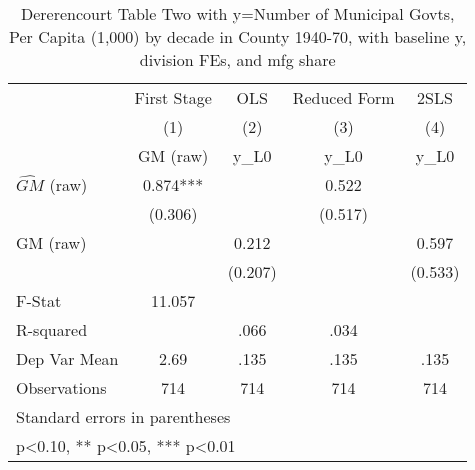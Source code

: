 \begin{table}[htbp]\centering
\def\sym#1{\ifmmode^{#1}\else\(^{#1}\)\fi}
\caption{Dererencourt Table Two with y=Number of Municipal Govts, Per Capita (1,000) by decade in County 1940-70, with baseline y, division FEs, and mfg share}
\begin{tabular}{l*{4}{c}}
\toprule
                    & First Stage   &         OLS   &Reduced Form   &        2SLS   \\
                    &\multicolumn{1}{c}{(1)}&\multicolumn{1}{c}{(2)}&\multicolumn{1}{c}{(3)}&\multicolumn{1}{c}{(4)}\\
                    &\multicolumn{1}{c}{GM  (raw)}&\multicolumn{1}{c}{y\_L0}&\multicolumn{1}{c}{y\_L0}&\multicolumn{1}{c}{y\_L0}\\
\midrule
$\hat{GM}$ (raw)    &       0.874***&               &       0.522   &               \\
                    &     (0.306)   &               &     (0.517)   &               \\
\addlinespace
GM  (raw)           &               &       0.212   &               &       0.597   \\
                    &               &     (0.207)   &               &     (0.533)   \\
\midrule
F-Stat              &      11.057   &               &               &               \\
R-squared           &               &        .066   &        .034   &               \\
Dep Var Mean        &        2.69   &        .135   &        .135   &        .135   \\
Observations        &         714   &         714   &         714   &         714   \\
\bottomrule
\multicolumn{5}{l}{\footnotesize Standard errors in parentheses}\\
\multicolumn{5}{l}{\footnotesize * p<0.10, ** p<0.05, *** p<0.01}\\
\end{tabular}
\end{table}

